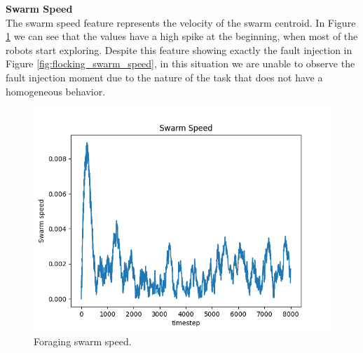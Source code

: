\documentclass[../../Thesis.tex]{subfiles}
\begin{document}
					\textbf{Swarm Speed}\\
The swarm speed feature represents the velocity of the swarm centroid. In Figure \ref{fig:foraging_swarm_speed} we can see that the values have a high spike at the beginning, when most of the robots start exploring. Despite this feature showing exactly the fault injection in Figure \ref{fig:flocking_swarm_speed}, in this situation we are unable to observe the fault injection moment due to the nature of the task that does not have a homogeneous behavior.					
					\begin{figure}
						\centering
						\includegraphics[scale=0.4]{../../Images/Experiments/foraging_size6x8_bot_number38_fault_10_percent_rotating_fault_after_1000/Swarm_speed.png}
						\caption{Foraging swarm speed.}
						\label{fig:foraging_swarm_speed}
					\end{figure}
					
\end{document}
